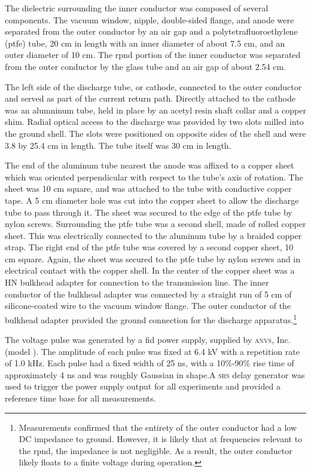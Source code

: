 The dielectric surrounding the inner conductor was composed of several
components. The vacuum window, nipple, double-sided flange, and anode were
separated from the outer conductor by an air gap and a polytetrafluoroethylene
(\acs{ptfe}) tube, 20 cm in length with an inner diameter of about 7.5 cm, and
an outer diameter of 10 cm. The \acs{rpnd} portion of the inner conductor was
separated from the outer conductor by the glass tube and an air gap of about
2.54 cm.

The left side of the discharge tube, or cathode, connected to the outer
conductor and served as part of the current return path. Directly attached to
the cathode was an alumninum tube, held in place by an acetyl resin shaft collar
and a copper shim. Radial optical access to the discharge was provided by two
slots milled into the ground shell. The slots were positioned on opposite sides
of the shell and were 3.8 by 25.4 cm in length. The tube itself was 30 cm in
length.

The end of the aluminum tube nearest the anode was affixed to a copper sheet
which was oriented perpendicular with respect to the tube's axis of rotation.
The sheet was 10 cm square, and was attached to the tube with conductive copper
tape. A 5 cm diameter hole was cut into the copper sheet to allow the discharge
tube to pass through it. The sheet was secured to the edge of the \acs{ptfe}
tube by nylon screws. Surrounding the \acs{ptfe} tube was a second shell, made
of rolled copper sheet. This was electrically connected to the aluminum tube by
a braided copper strap. The right end of the \acs{ptfe} tube was covered by a
second copper sheet, 10 cm square. Again, the sheet was secured to the
\acs{ptfe} tube by nylon screws and in electrical contact with the copper shell.
In the center of the copper sheet was a HN bulkhead adapter for connection to
the transmission line. The inner conductor of the bulkhead adapter was connected
by a straight run of 5 cm of silicone-coated wire to the vacuum window flange.
The outer conductor of the bulkhead adapter provided the ground connection for
the discharge apparatus.\footnote{Measurements confirmed that the entirety of
the outer conductor had a low DC impedance to ground. However, it is likely that
at frequencies relevant to the \acs{rpnd}, the impedance is not negligible. As a
result, the outer conductor likely floats to a finite voltage during operation.}

The voltage pulse was generated by a \acs{fid} power supply, supplied by
\textsc{anvs}, Inc. (model ). The amplitude of each pulse was
fixed at 6.4 kV with a repetition rate of 1.0 kHz. Each pulse had a fixed width
of 25 ns, with a 10\%-90\% rise time of approximately 4 ns and was roughly
Gaussian in shape.A \textsc{srs}  delay generator was used to
trigger the power supply output for all experiments and provided a reference
time base for all measurements.

